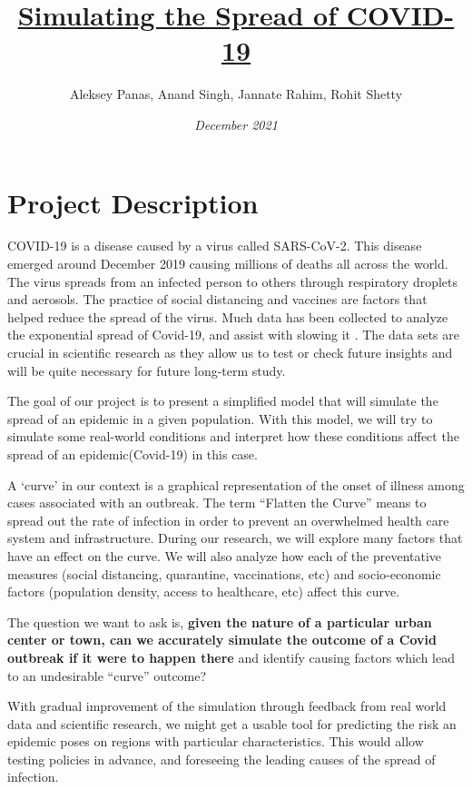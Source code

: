 \documentclass{article}
\title{\textbf{\underline{Simulating the Spread of COVID-19}}}
\author{Aleksey Panas, Anand Singh, Jannate Rahim, Rohit Shetty}
\date{\emph{December 2021}}
\begin{document}
\maketitle

\section{Project Description}

COVID-19 is a disease caused by a virus called SARS-CoV-2. This disease emerged around December 2019 causing millions of deaths all across the world. The virus spreads from an infected person to others through respiratory droplets and aerosols. The practice of social distancing and vaccines are factors that helped reduce the spread of the virus. Much data has been collected to analyze the exponential spread of Covid-19, and assist with slowing it . The data sets are crucial in scientific research as they allow us to test or check future insights and will be quite necessary for future long-term study.
\bigskip

The goal of our project is to present a simplified model that will simulate the spread of an epidemic in a given population. With this model, we will try to simulate some real-world conditions and interpret how these conditions affect the spread of an epidemic(Covid-19) in this case. 
\bigskip

A ‘curve’ in our context is a graphical representation of the onset of illness among cases associated with an outbreak.
The term “Flatten the Curve” means to spread out the rate of infection in order to prevent an overwhelmed health care system and infrastructure. During our research, we will explore many factors that have an effect on the curve. We will also analyze how each of the preventative measures (social distancing, quarantine, vaccinations, etc) and socio-economic factors (population density, access to healthcare, etc) affect this curve. 
\bigskip

The question we want to ask is, \textbf{given the nature of a particular urban center or town, can we accurately simulate the outcome of a Covid outbreak if it were to happen there} and identify causing factors which lead to an undesirable “curve” outcome?

\bigskip
With gradual improvement of the simulation through feedback from real world data and scientific research, we might get a usable tool for predicting the risk an epidemic poses on regions with particular characteristics. This would allow testing policies in advance, and foreseeing the leading causes of the spread of infection.
\end{document}
